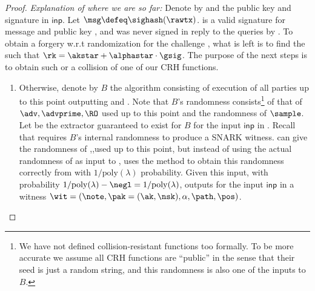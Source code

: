 \documentclass[11pt]{article}
\numberwithin{equation}{section} %
\numberwithin{figure}{section} %
\newcommand{\inp}{\ensuremath{\mathsf{inp}}\xspace}
\newcommand{\set}[1]{\ensuremath{\left\{#1\right\}}\xspace}
\newcommand{\poly}{\ensuremath{\mathrm{poly}(\lambda)}\xspace}
\begin{document}
\begin{proof}
\textit{Explanation of where we are so far:} Denote by \rk and \sig the public key and signature in \inp. Let $\msg \defeq \sighash(\rawtx)$. \sig is a valid signature for message \msg and public key \rk, and \msg was never signed in reply to the \signallinputs queries by \oracle. To obtain a forgery w.r.t randomization for the challenge \akstar, what is left is to find the \alphastar such that $\rk=\akstar+\alphastar\cdot \gsig$. The purpose of the next steps is to obtain such \alphastar or a collision of one of our CRH functions.
%  
\begin{enumerate}[resume]
 \item Otherwise, denote by $B$ the algorithm consisting of execution of all parties up to this point outputting \tx and \primeof{\tx}. Note that $B$'s randomness consists\footnote{We have not defined collision-resistant functions too formally. To be more accurate we assume all CRH functions are ``public'' in the sense that their seed is just a random string, and this randomness is also one of the inputs to $B$.} of that of $\adv,\advprime,\RO$ used up to this point and the randomness of $\sample$.
 Let \ext be the extractor guaranteed to exist for $B$ for the input \inp in \tx. Recall that \ext requires $B$'s internal randomness to produce a SNARK witness. \advprime can give \ext the randomness of \advprime,\adv,\RO used up to this point, but instead of using the actual randomness of \sample as input to \ext, \advprime uses the \invert method to obtain this randomness correctly from \ak with $1/\poly$ probability. Given this input, with probability $1/\poly - \negl= 1/\poly$, \ext outputs for the input \inp in \tx a witness $\wit=(\note,\pak=(\ak,\nsk),\alpha,\path,\pos)$.

\end{enumerate}
\end{proof}
\end{document}
